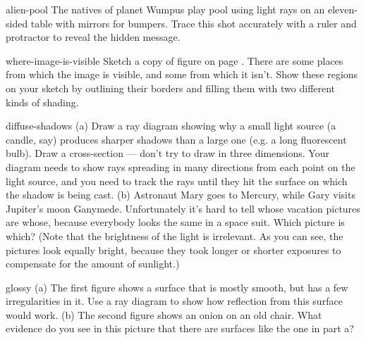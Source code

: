 \begin{hwsection}

\begin{hw}{alien-pool}
The natives of planet Wumpus play pool using light rays on an eleven-sided
table with mirrors for bumpers. Trace this shot accurately with a ruler and protractor
to reveal the hidden message.
\end{hw}


\begin{hw}{where-image-is-visible}
Sketch a copy of figure  on page \pageref{fig:flatmirrorimage}.
There are some places from which the image is visible, and some
from which it isn't. Show these regions on your sketch by outlining their borders and
filling them with two different kinds of shading.
\end{hw}

\begin{hw}{diffuse-shadows}
(a) Draw a ray diagram showing why a small light source (a
candle, say) produces sharper shadows than a large one (e.g.
a long fluorescent bulb). Draw a cross-section --- don't try to draw in three dimensions.
Your diagram needs to show rays spreading in many directions from each point on the
light source, and you need to track the rays until they hit the surface on which
the shadow is being cast. \hwendpart
(b) Astronaut Mary goes to Mercury,
while Gary visits Jupiter's moon Ganymede. Unfortunately it's hard to
tell whose vacation pictures are whose, because everybody looks the same
in a space suit. Which picture is which? (Note that the brightness of the light
is irrelevant. As you can see, the pictures look equally bright, because they
took longer or shorter exposures to compensate for the amount of sunlight.)
\end{hw}

\begin{hw}{glossy}
(a) The first figure shows a surface that is mostly smooth, but has a few irregularities in it.
Use a ray diagram to show how reflection from this surface would work.\hwendpart
(b) The second figure shows an onion on an old chair. What evidence do you see in this
picture that there are surfaces like the one in part a?
\end{hw}


\end{hwsection}
